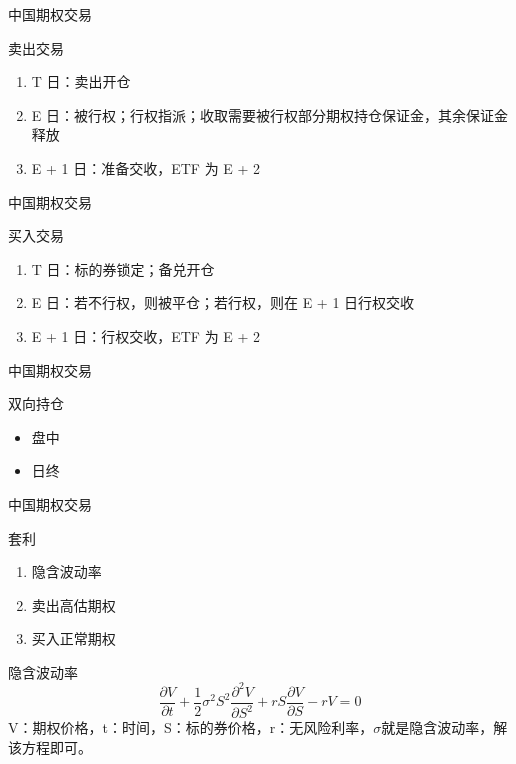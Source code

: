 \documentclass[12pt]{ctexbeamer}	%
\begin{document}
\begin{frame}{中国期权交易}
  \begin{block}{卖出交易}
    \begin{enumerate}
      \item T 日：卖出开仓
      \item E 日：被行权；行权指派；收取需要被行权部分期权持仓保证金，其余保证金释放
      \item E + 1 日：准备交收，ETF 为 E + 2
    \end{enumerate}
  \end{block}
\end{frame}

\begin{frame}{中国期权交易}
  \begin{block}{买入交易}
    \begin{enumerate}
      \item T 日：标的券锁定；备兑开仓
      \item E 日：若不行权，则被平仓；若行权，则在 E + 1 日行权交收
      \item E + 1 日：行权交收，ETF 为 E + 2
    \end{enumerate}
  \end{block}
\end{frame}

\begin{frame}{中国期权交易}
  \begin{block}{双向持仓}
    \begin{itemize}
      \item 盘中
      \item 日终
    \end{itemize}
  \end{block}
\end{frame}

\begin{frame}{中国期权交易}
  \begin{block}{套利}
    \begin{enumerate}
      \item 隐含波动率
      \item 卖出高估期权
      \item 买入正常期权
    \end{enumerate}
  \end{block}
  \pause
  \begin{block}{隐含波动率}
    $$\frac{\partial V}{\partial t} + \frac{1}{2}\sigma^2 S^2\frac{\partial^2 V}{\partial S^2} + rS\frac{\partial V}{\partial S} - rV=0$$
    V：期权价格，t：时间，S：标的券价格，r：无风险利率，$\sigma$就是隐含波动率，解该方程即可。
  \end{block}
\end{frame}
\end{document}
